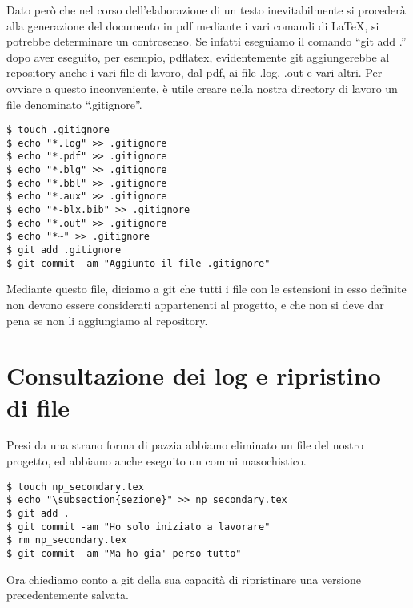 \documentclass{article}
\begin{document}
Dato però che nel corso dell'elaborazione di un testo inevitabilmente si
procederà alla generazione del documento in pdf mediante i vari comandi di
\LaTeX, si potrebbe determinare un controsenso. Se infatti eseguiamo il comando
``git add .'' dopo aver eseguito,
per esempio, pdflatex, evidentemente git aggiungerebbe al repository anche i
vari file di lavoro, dal pdf, ai file .log, .out e vari altri.
Per ovviare a questo inconveniente, è utile creare nella nostra directory di
lavoro un file denominato ``.gitignore''.

\begin{lstlisting}
$ touch .gitignore
$ echo "*.log" >> .gitignore
$ echo "*.pdf" >> .gitignore
$ echo "*.blg" >> .gitignore
$ echo "*.bbl" >> .gitignore
$ echo "*.aux" >> .gitignore
$ echo "*-blx.bib" >> .gitignore
$ echo "*.out" >> .gitignore
$ echo "*~" >> .gitignore
$ git add .gitignore
$ git commit -am "Aggiunto il file .gitignore"
\end{lstlisting}

Mediante questo file, diciamo a git che tutti i file con le estensioni in esso
definite non devono essere considerati appartenenti al progetto, e che non si
deve dar pena se non li aggiungiamo al repository.

\section{Consultazione dei log e ripristino di file}
Presi da una strano forma di pazzia abbiamo eliminato un file del nostro
progetto, ed abbiamo anche eseguito un commi masochistico.

\begin{lstlisting}
$ touch np_secondary.tex
$ echo "\subsection{sezione}" >> np_secondary.tex
$ git add .
$ git commit -am "Ho solo iniziato a lavorare"
$ rm np_secondary.tex
$ git commit -am "Ma ho gia' perso tutto"
\end{lstlisting}

Ora chiediamo conto a git della sua capacità di ripristinare una versione
precedentemente salvata.
\end{document}
